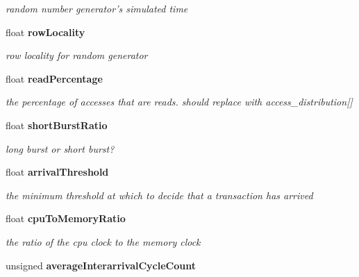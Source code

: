 \begin{CompactItemize}
\begin{CompactList}\small\item\em random number generator's simulated time \item\end{CompactList}\item 
float {\bf rowLocality}\label{class_d_r_a_msim_i_i_1_1_input_stream_7e22f35612add8cca13d82dc6e19dafd}

\begin{CompactList}\small\item\em row locality for random generator \item\end{CompactList}\item 
float {\bf readPercentage}\label{class_d_r_a_msim_i_i_1_1_input_stream_37863b3a3f7a96f6a9a8b5c673677c4c}

\begin{CompactList}\small\item\em the percentage of accesses that are reads. should replace with access\_\-distribution[] \item\end{CompactList}\item 
float {\bf shortBurstRatio}\label{class_d_r_a_msim_i_i_1_1_input_stream_db181cfcc298b360c316c2398146f7e5}

\begin{CompactList}\small\item\em long burst or short burst? \item\end{CompactList}\item 
float {\bf arrivalThreshold}\label{class_d_r_a_msim_i_i_1_1_input_stream_568a842c71aabd7c59ff440277989fa0}

\begin{CompactList}\small\item\em the minimum threshold at which to decide that a transaction has arrived \item\end{CompactList}\item 
float {\bf cpuToMemoryRatio}\label{class_d_r_a_msim_i_i_1_1_input_stream_032d85a4a44d5160f9c7f7411f242307}

\begin{CompactList}\small\item\em the ratio of the cpu clock to the memory clock \item\end{CompactList}\item 
unsigned {\bf averageInterarrivalCycleCount}\label{class_d_r_a_msim_i_i_1_1_input_stream_50ab206ccc66b560f4181d4c33e3c6d2}


\end{CompactItemize}

